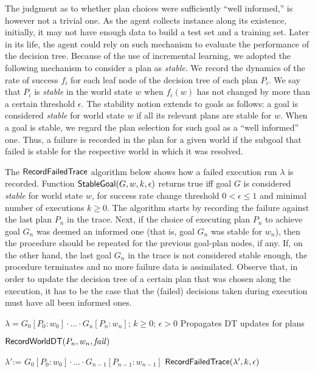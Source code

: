 \documentclass{article}
\begin{document}
The judgment as to whether plan choices were sufficiently ``well
informed,'' is however not a trivial one. As the agent collects
instance along its existence, initially, it may not have enough data
to build a test set and a training set. Later in its life, the agent
could rely on such mechanism to evaluate the performance of the
decision tree. Because of the use of incremental learning, we adopted
the following mechanism to consider a plan as \emph{stable}. We record
the dynamics of the rate of success $f_i$ for each leaf node of the
decision tree of each plan $P_i$.  We say that $P_i$ is \emph{stable}
in the world state $w$ when $f_i(w)$ has not changed by more than a
certain threshold $\epsilon$.  The stability notion extends to goals
as follows: a goal is considered \emph{stable} for world state $w$ if
all its relevant plans are stable for $w$.
When a goal is stable, we regard the plan selection for such goal as a
``well informed'' one. Thus, a failure is recorded in the plan for a
given world if the subgoal that failed is stable for the respective
world in which it was resolved.


The $\mathsf{RecordFailedTrace}$ algorithm below shows how a failed execution run
$\lambda$ is recorded. Function $\mathsf{StableGoal}(G,w,k,\epsilon)$ returns
true iff goal $G$ is considered \textit{stable} for world state $w$,
for success rate change threshold $0 < \epsilon \leq 1$ and minimal
number of executions $k \geq 0$.
%
The algorithm starts by recording the failure against the last plan
$P_n$ in the trace.
Next, if the choice of executing plan $P_n$ to achieve goal $G_n$ was
deemed an informed one (that is, goal $G_n$ was stable for $w_n$),
then the procedure should be repeated for the previous goal-plan
nodes, if any.
If, on the other hand, the last goal $G_n$ in the trace is not
considered stable enough, the procedure terminates and no more failure
data is assimilated.
Observe that, in order to update the decision tree of a certain plan
that was chosen along the execution, it has to be the case that the
(failed) decisions taken during execution must have all been informed
ones.
 
 \renewcommand{\algorithmiccomment}[1]{\hfill \texttt{\small // #1}}
 \newcommand{\assign}{\mbox{:=\ }}
 \begin{algorithm}[h]
	\caption{$\RecordTrace(\lambda,k,\epsilon)$}\label{algo:record_failed_exec}
	\label{alg:NDS}
  \begin{algorithmic}[1]
    \REQUIRE $\lambda=G_0[P_0:w_0] \cdot \ldots \cdot G_n[P_n:w_n]$; $k\geq0$;
    $\epsilon > 0$ \ENSURE Propagates DT updates for plans

	\STATE $\mathsf{RecordWorldDT}(P_n,w_n,\mbox{\emph{fail}})$

    	 \STATE $\lambda' \assign G_0[P_0:w_0] \cdot \ldots \cdot
    				G_{n-1}[P_{n-1}:w_{n-1}]$
    	\STATE $\mathsf{RecordFailedTrace}(\lambda',k,\epsilon)$ 
    \ENDIF
  \end{algorithmic}
\end{algorithm}
\end{document}
